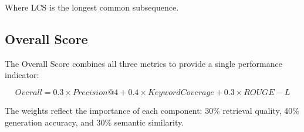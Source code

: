 \documentclass[conference]{IEEEtran}
\begin{document}
Where LCS is the longest common subsequence.

\subsection*{Overall Score}
The Overall Score combines all three metrics to provide a single performance indicator:

\begin{equation}
Overall = 0.3 \times Precision@4 + 0.4 \times KeywordCoverage + 0.3 \times ROUGE-L
\end{equation}

The weights reflect the importance of each component: 30\% retrieval quality, 40\% generation accuracy, and 30\% semantic similarity.
\end{document}
